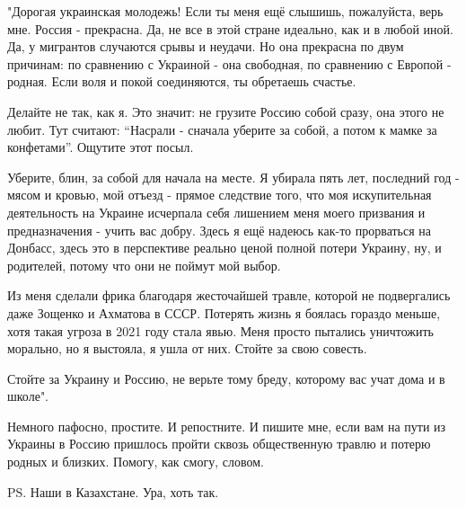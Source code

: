 \begin{zzquote}
"Дорогая украинская молодежь! Если ты меня ещё слышишь, пожалуйста, верь мне.
Россия - прекрасна. Да, не все в этой стране идеально, как и в любой иной. Да,
у мигрантов случаются срывы и неудачи. Но она прекрасна по двум причинам: по
сравнению с Украиной - она свободная, по сравнению с Европой - родная. Если
воля и покой соединяются, ты обретаешь счастье. 

Делайте не так, как я. Это значит: не грузите Россию собой сразу, она этого не
любит. Тут считают: \enquote{Насрали - сначала уберите за собой, а потом к мамке за
конфетами}. Ощутите этот посыл. 

Уберите, блин, за собой для начала на месте. Я убирала пять лет, последний год
- мясом и кровью, мой отъезд - прямое следствие того, что моя искупительная
деятельность на Украине исчерпала себя лишением меня моего призвания и
предназначения - учить вас добру. Здесь я ещё надеюсь как-то прорваться на
Донбасс, здесь это в перспективе реально ценой полной потери Украину, ну, и
родителей, потому что они не поймут мой выбор.

Из меня сделали фрика благодаря жесточайшей травле, которой не подвергались
даже Зощенко и Ахматова в СССР. Потерять  жизнь я боялась гораздо меньше, хотя
такая угроза в 2021 году стала явью. Меня просто пытались уничтожить морально,
но я выстояла, я ушла от них. Стойте за свою совесть. 

Стойте за Украину и Россию, не верьте тому бреду, которому вас учат дома и в
школе".
\end{zzquote}

Немного пафосно, простите. И репостните. И пишите мне, если вам на пути из
Украины в Россию пришлось пройти сквозь общественную травлю и потерю родных и
близких. Помогу, как смогу, словом.

PS. Наши в Казахстане. Ура, хоть так.
